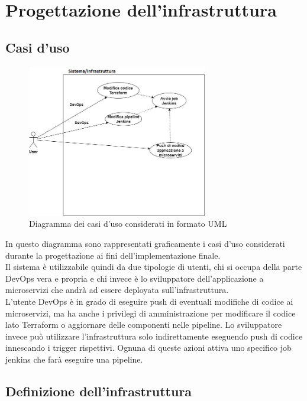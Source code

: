 \documentclass[a4paper,12pt]{report}
\begin{document}
\chapter{Progettazione dell'infrastruttura}
\section{Casi d'uso}

\begin{figure}[h]
	\includegraphics[width=0.7\textwidth]{casi_uso}
    \caption{Diagramma dei casi d'uso considerati in formato UML}
    \label{fig:casi_uso}
\end{figure}
In questo diagramma sono rappresentati graficamente i casi d'uso considerati durante la progettazione ai fini dell'implementazione finale.\\
Il sistema è utilizzabile quindi da due tipologie di utenti, chi si occupa della parte DevOps vera e propria e chi invece è lo sviluppatore dell'applicazione a microservizi che andrà ad essere deployata sull'infrastruttura.\\
L'utente DevOps è in grado di eseguire push di eventuali modifiche di codice ai microservizi, ma ha anche i privilegi di amministrazione per modificare il codice lato Terraform o aggiornare delle componenti nelle pipeline. Lo sviluppatore invece può utilizzare l'infrastruttura solo indirettamente eseguendo push di codice innescando i trigger rispettivi. Ognuna di queste azioni attiva uno specifico job jenkins che farà eseguire una pipeline.\\
\section{Definizione dell'infrastruttura}
\end{document}
